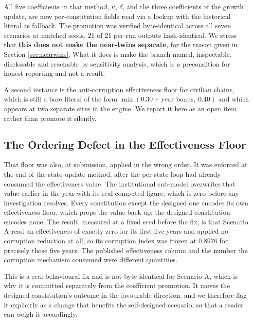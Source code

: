\documentclass{ieeeaccess}
\newif\ifpendingvisible
\newcommand{\todo}[1]{%
  \ifpendingvisible\textcolor{red}{\textbf{[\MakeUppercase{#1}]}}\fi}
\begin{document}
All five coefficients in that method, $\kappa$, $\delta$, and the three
coefficients of the growth update, are now per-constitution fields read
via a lookup with the historical literal as fallback. The promotion was
verified byte-identical across all seven scenarios at matched seeds,
21 of 21 per-run outputs hash-identical. We stress that \textbf{this
does not make the near-twins separate}, for the reason given in Section
\ref{sec:nearwins}. What it does is make the branch named, inspectable,
disclosable and reachable by sensitivity analysis, which is a
precondition for honest reporting and not a result.

A second instance is the anti-corruption effectiveness floor for
civilian chains, which is still a bare literal of the form
$\min(0.30 + \text{year bonus},\ 0.40)$ and which appears at two
separate sites in the engine. We report it here as an open item rather
than promote it silently.

\subsection{The Ordering Defect in the Effectiveness Floor}
That floor was also, at submission, applied in the wrong order. It was
enforced at the end of the state-update method, after the per-state loop
had already consumed the effectiveness value. The institutional
sub-model overwrites that value earlier in the year with its real
computed figure, which is zero before any investigation resolves. Every
constitution except the designed one encodes its own effectiveness
floor, which props the value back up; the designed constitution encodes
none. The result, measured at a fixed seed before the fix, is that
Scenario A read an effectiveness of exactly zero for its first five
years and applied no corruption reduction at all, so its corruption
index was frozen at 0.8976 for precisely those five years. The published
effectiveness column and the number the corruption mechanism consumed
were different quantities.

This is a real behavioural fix and is not byte-identical for Scenario A,
which is why it is committed separately from the coefficient promotion.
It moves the designed constitution's outcome in the favourable
direction, and we therefore flag it explicitly as a change that benefits
the self-designed scenario, so that a reader can weigh it accordingly.
\todo{PENDING CAMPAIGN: the recomputed Scenario A corruption trajectory
under the corrected ordering at the publication $N$. The provisional
single-seed figure measured during the fix is a 24 percent reduction in
year-50 corruption, which is not a publication quantity.}
\end{document}
